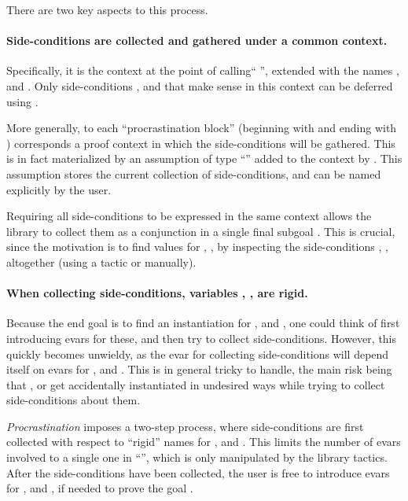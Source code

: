 \documentclass[xetex,format=acmlarge,screen=true,authorversion=true]{acmart-modified}
\begin{document}
There are two key aspects to this process.

\paragraph{Side-conditions are collected and gathered under a common context.}
Specifically, it is the context at the point of calling``
'', extended with the names ,
 and . Only side-conditions ,  and  that make
sense in this context can be deferred using .

More generally, to each ``procrastination block'' (beginning with  and ending with ) corresponds a proof
context in which the side-conditions will be gathered. This is in fact
materialized by an assumption of type ``'' added to the context
by . This assumption stores the current collection of
side-conditions, and can be named explicitly by the user.

Requiring all side-conditions to be expressed in the same context allows the
library to collect them as a conjunction in a single final subgoal . This is crucial, since the motivation is to find values
for , ,  by inspecting the side-conditions , ,
 altogether (using a tactic or manually).


\paragraph{When collecting side-conditions, variables , ,  are rigid.}
Because the end goal is to find an instantiation for ,  and ,
one could think of first introducing evars for these, and then try to collect
side-conditions. However, this quickly becomes unwieldy, as the evar for
collecting side-conditions will depend itself on evars for ,  and
. This is in general tricky to handle, the main risk being that ,
 or  get accidentally instantiated in undesired ways while trying
to collect side-conditions about them.

\emph{Procrastination} imposes a two-step process, where side-conditions are
first collected with respect to ``rigid'' names for ,  and .
This limits the number of evars involved to a single one in ``'', which is only manipulated by the library tactics. After the
side-conditions have been collected, the user is free to introduce evars for
,  and , if needed to prove the goal .
\end{document}
